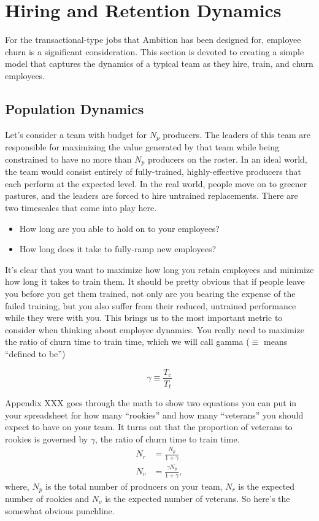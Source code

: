\documentclass[paper=a4, fontsize=11pt abstract]{scrartcl}
\numberwithin{equation}{section}		%
\numberwithin{figure}{section}			%
\numberwithin{table}{section}				%
\begin{document}
\section{Hiring and Retention Dynamics}
For the transactional-type jobs that Ambition has been designed for, employee churn is a significant consideration.  This section is devoted to creating a simple model that captures the dynamics of a typical team as they hire, train, and churn employees.

\subsection{Population Dynamics}
Let's consider a team with budget for $N_p$ producers.  The leaders of this team are responsible for maximizing the value generated by that team while being constrained to have no more than $N_p$ producers on the roster.  In an ideal world, the team would consist entirely of fully-trained, highly-effective producers that each perform at the expected level.  In the real world, people move on to greener pastures, and the leaders are forced to hire untrained replacements.  There are two timescales that come into play here.
\begin{itemize}
    \item How long are you able to hold on to your employees?
    \item How long does it take to fully-ramp new employees?
\end{itemize}
It's clear that you want to maximize how long you retain employees and minimize how long it takes to train them. It should be pretty obvious that if people leave you before you get them trained, not only are you bearing the expense of the failed training, but you also suffer from their reduced, untrained performance while they were with you.  This brings us to  the most important metric to consider when thinking about employee dynamics.  You really need to maximize the ratio of churn time to train time, which we will call gamma ($\equiv$ means ``defined to be'')

\begin{equation}
    \gamma \equiv \frac{T_c}{T_t}
\end{equation}

Appendix XXX goes through the math to show two equations you can put in your spreadsheet for how many ``rookies'' and how many ``veterans'' you should expect to have on your team.  It turns out that the proportion of veterans to rookies is governed by $\gamma$, the ratio of churn time to train time.
\begin{align}
    N_r &= \frac{N_p}{1 + \gamma} \\
    N_v &= \frac{\gamma N_p}{1 + \gamma},
\end{align}
where, $N_p$ is the total number of producers on your team, $N_r$ is the expected number of rookies and $N_v$ is the expected number of veterans.  So here's the somewhat obvious punchline.
\end{document}

